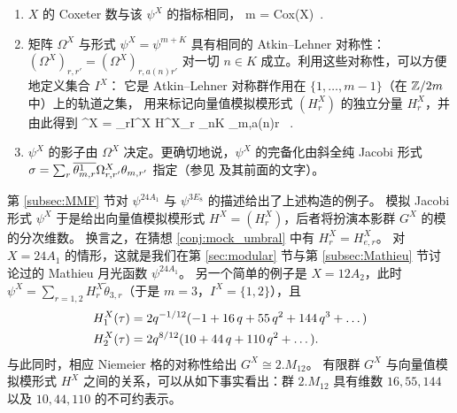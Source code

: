 
\vspace{-6,5pt}
\begin{enumerate}
\item $X$ 的 Coxeter 数与该 $\psi^X$ 的指标相同，
\vspace{-0,5pt}
\be\label{eqn:Cox_index}
m = {\rm Cox}(X)~.
\ee
\vspace{-25pt}
\item  矩阵 $\Omega^X$ 与形式 $\psi^X=\psi^{m+K}$ 具有相同的 Atkin--Lehner 对称性：
$(\Omega^X)_{r,r'}=(\Omega^X)_{r,a(n)r'}$ 对一切 $n\in K$ 成立。利用这些对称性，可以方便地定义集合 $I^X$：
它是 Atkin--Lehner 对称群作用在 $\{1,\dots,m-1\}$（在 $\mathbb{Z}/2m$ 中）上的轨道之集，
用来标记向量值模拟模形式 $(H^X_r)$ 的独立分量 $H_r^X$，并由此得到
\be\label{def:setIX}
\psi^X = \sum_{r\in I^X} H^X_r \sum_{n\in K} \tilde \theta_{m,a(n)r} ~. 
\ee
\vspace{-15pt}
\item $\psi^X$ 的影子由 $\Omega^X$ 决定。更确切地说，$\psi^X$ 的完备化由斜全纯 Jacobi 形式 $\sigma = \sum_r \overline{\theta^1_{m,r}} \Omega^{X}_{r,r'} \theta_{m,r'}$ 指定（参见  及其前面的文字）。
\end{enumerate}
\vspace{-6,5pt}

第 \ref{subsec:MMF} 节对 $\psi^{24A_1}$ 与 $\psi^{3E_8}$ 的描述给出了上述构造的例子。
模拟 Jacobi 形式 $\psi^X$ 于是给出向量值模拟模形式 $H^{X} = (H^X_r)$，后者将扮演本影群 $G^X$ 的模的分次维数。
换言之，在猜想 \ref{conj:mock_umbral} 中有 $H^X_r=H^X_{e,r}$。
对 $X=24A_1$ 的情形，这就是我们在第 \ref{sec:modular} 节与第 \ref{subsec:Mathieu} 节讨论过的 Mathieu 月光函数 $\psi^{24A_1}$。
另一个简单的例子是 $X=12A_2$，此时 $\psi^{X} =\sum_{r=1,2} H^X_r\tilde \theta_{3,r}$（于是 $m=3$，$I^X=\{1,2\}$），且
\begin{gather}\begin{split}
H^X_1(\tau)& =   2 q^{-1/12} (-1 + 16 \,q+ 55 \,q^2+ 144  \,q^3+\dots)\\ 
H^X_2(\tau)& =  2 q^{8/12} (10 + 44 \,q+ 110 \,q^2+\dots) . 
\end{split}
\end{gather}
与此同时，相应 Niemeier 格的对称性给出 $G^X \cong 2.M_{12}$。
有限群 $G^X$ 与向量值模拟模形式 $H^X$ 之间的关系，可以从如下事实看出：群 $2.M_{12}$ 具有维数 $16,55, 144$ 以及 $10,44,110$ 的不可约表示。

